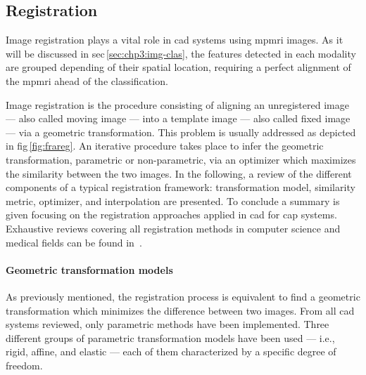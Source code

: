 \subsection{Registration}\label{subsec:chp3:img-reg:reg}


Image registration plays a vital role in \ac{cad} systems using \ac{mpmri} images.
As it will be discussed in \acs{sec}\,\ref{sec:chp3:img-clas}, the features detected in each modality are grouped depending of their spatial location, requiring a perfect alignment of the \ac{mpmri} ahead of the classification.

Image registration is the procedure consisting of aligning an unregistered image --- also called moving image --- into a template image --- also called fixed image --- via a geometric transformation.
This problem is usually addressed as depicted in \ac{fig}\,\ref{fig:frareg}.
An iterative procedure takes place to infer the geometric transformation, parametric or non-parametric, via an optimizer which maximizes the similarity between the two images.
In the following, a review of the different components of a typical registration framework: transformation model, similarity metric, optimizer, and interpolation are presented.
To conclude a summary is given focusing on the registration approaches applied in \ac{cad} for \ac{cap} systems.
Exhaustive reviews covering all registration methods in computer science and medical fields can be found in~\cite{Maintz1998,Zitova2003}.



\paragraph{Geometric transformation models}
As previously mentioned, the registration process is equivalent to find a geometric transformation which minimizes the difference between two images.
From all \ac{cad} systems reviewed, only parametric methods have been implemented.
Three different groups of parametric transformation models have been used --- i.e., rigid, affine, and elastic --- each of them characterized by a specific degree of freedom.


